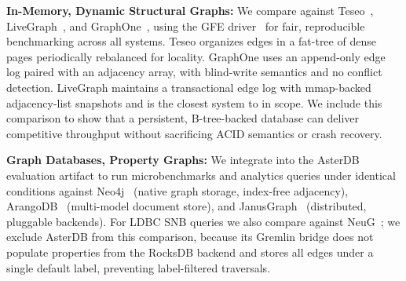 \textbf{In-Memory, Dynamic Structural Graphs:}
We compare against Teseo~\cite{teseo2021deLeo}, LiveGraph~\cite{zhu2019livegraph}, and GraphOne~\cite{graphone2019kumar}, using the GFE driver~\cite{teseo2021deLeo} for fair, reproducible benchmarking across all systems.
Teseo organizes edges in a fat-tree of dense pages periodically rebalanced for locality. %
GraphOne uses an append-only edge log paired with an adjacency array, with blind-write semantics and no conflict detection.
LiveGraph maintains a transactional edge log with mmap-backed adjacency-list snapshots and is the closest system to \project{} in scope.
We include this comparison to show that a persistent, B-tree-backed database can deliver competitive throughput without sacrificing ACID semantics or crash recovery.

\textbf{Graph Databases, Property Graphs:}
We integrate \project{} into the AsterDB~\cite{moAsterEnhancingLSMstructures2025} evaluation artifact to run microbenchmarks and analytics queries under identical conditions against Neo4j~\cite{neo4j} (native graph storage, index-free adjacency), ArangoDB~\cite{arangodb} (multi-model document store), and JanusGraph~\cite{janusgraph} (distributed, pluggable backends).
For LDBC SNB queries we also compare against NeuG~\cite{NeuG2025Alibaba}; we exclude AsterDB from this comparison, because its Gremlin bridge does not populate properties from the RocksDB backend and stores all edges under a single default label, preventing label-filtered traversals.